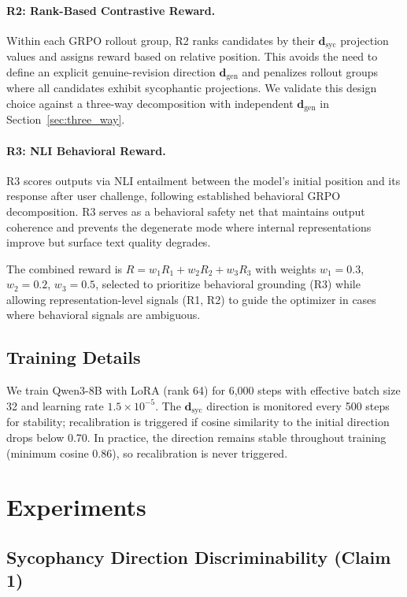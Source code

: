 \documentclass[11pt]{article}
\begin{document}
\paragraph{R2: Rank-Based Contrastive Reward.}
Within each GRPO rollout group, R2 ranks candidates by their $\mathbf{d}_\text{syc}$ projection values and assigns reward based on relative position. This avoids the need to define an explicit genuine-revision direction $\mathbf{d}_\text{gen}$ and penalizes rollout groups where all candidates exhibit sycophantic projections. We validate this design choice against a three-way decomposition with independent $\mathbf{d}_\text{gen}$ in Section~\ref{sec:three_way}.

\paragraph{R3: NLI Behavioral Reward.}
R3 scores outputs via NLI entailment between the model's initial position and its response after user challenge, following established behavioral GRPO decomposition. R3 serves as a behavioral safety net that maintains output coherence and prevents the degenerate mode where internal representations improve but surface text quality degrades.

The combined reward is $R = w_1 R_1 + w_2 R_2 + w_3 R_3$ with weights $w_1=0.3$, $w_2=0.2$, $w_3=0.5$, selected to prioritize behavioral grounding (R3) while allowing representation-level signals (R1, R2) to guide the optimizer in cases where behavioral signals are ambiguous.

\subsection{Training Details}

We train Qwen3-8B with LoRA (rank 64) for 6,000 steps with effective batch size 32 and learning rate $1.5 \times 10^{-5}$. The $\mathbf{d}_\text{syc}$ direction is monitored every 500 steps for stability; recalibration is triggered if cosine similarity to the initial direction drops below 0.70. In practice, the direction remains stable throughout training (minimum cosine 0.86), so recalibration is never triggered.

\section{Experiments}

\subsection{Sycophancy Direction Discriminability (Claim 1)}
\label{sec:claim1}
\end{document}
